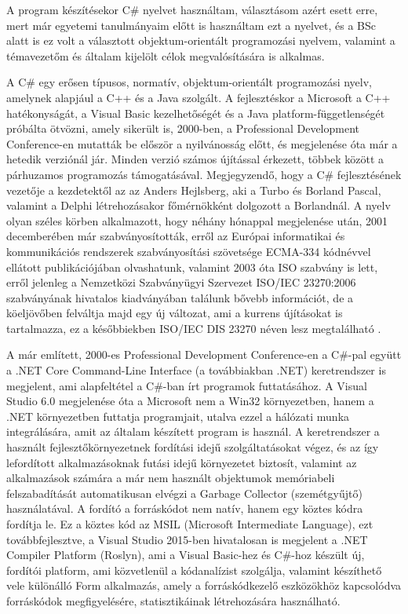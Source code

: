 A program készítésekor C\# nyelvet használtam, választásom azért esett erre, mert már egyetemi tanulmányaim előtt is használtam ezt a nyelvet, és a BSc alatt is ez volt a választott objektum-orientált programozási nyelvem, valamint a témavezetőm és általam kijelölt célok megvalósítására is alkalmas.\par
A C\# egy erősen típusos, normatív, objektum-orientált programozási nyelv, amelynek alapjául a C++ és a Java szolgált. A fejlesztéskor a Microsoft a C++ hatékonyságát, a Visual Basic kezelhetőségét és a Java platform-függetlenségét próbálta ötvözni, amely sikerült is, 2000-ben, a Professional Development Conference-en mutatták be először a nyilvánosság előtt, és megjelenése óta már a hetedik verziónál jár. Minden verzió számos újítással érkezett, többek között a párhuzamos programozás támogatásával. Megjegyzendő, hogy a C\# fejlesztésének vezetője a kezdetektől az az Anders Hejlsberg, aki a Turbo és Borland Pascal, valamint a Delphi létrehozásakor főmérnökként dolgozott a Borlandnál. A nyelv olyan széles körben alkalmazott, hogy néhány hónappal megjelenése után, 2001 decemberében már szabványosították, erről az Európai informatikai és kommunikációs rendszerek szabványosítási szövetsége ECMA-334 \cite{ecma_334_c_sharp} kódnévvel ellátott publikációjában olvashatunk, valamint 2003 óta ISO szabvány is lett, erről jelenleg a Nemzetközi Szabványügyi Szervezet ISO/IEC 23270:2006 \cite{iso_iec_c_sharp_2006} szabványának hivatalos kiadványában találunk bővebb információt, de a köeljövőben felváltja majd egy új változat, ami a kurrens újításokat is tartalmazza, ez a későbbiekben ISO/IEC DIS 23270 \cite{iso_iec_dis_c_sharp_future} néven lesz megtalálható .\par

A már említett, 2000-es Professional Development Conference-en a C\#-pal együtt a .NET Core Command-Line Interface (a továbbiakban .NET) keretrendszer is megjelent, ami alapfeltétel a C\#-ban írt programok futtatásához. A Visual Studio 6.0 megjelenése óta a Microsoft nem a Win32 környezetben, hanem a .NET környezetben futtatja programjait, utalva ezzel a hálózati munka integrálására, amit az általam készített program is használ. A keretrendszer a használt fejlesztőkörnyezetnek fordítási idejű szolgáltatásokat végez, és az így lefordított alkalmazásoknak futási idejű környezetet biztosít, valamint az alkalmazások számára a már nem használt objektumok memóriabeli felszabadítását automatikusan elvégzi a Garbage Collector (szemétgyűjtő) használatával. A fordító a forráskódot nem natív, hanem egy köztes kódra fordítja le. Ez a köztes kód az MSIL (Microsoft Intermediate Language), ezt továbbfejlesztve, a Visual Studio 2015-ben hivatalosan is megjelent a .NET Compiler Platform (Roslyn), ami a Visual Basic-hez és C\#-hoz készült új, fordítói platform, ami közvetlenül a kódanalízist szolgálja, valamint készíthető vele különálló Form alkalmazás, amely a forráskódkezelő eszközökhöz kapcsolódva forráskódok megfigyelésére, statisztikáinak létrehozására használható.\par

